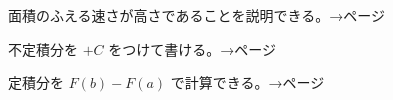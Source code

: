 \begin{furikaeri}
\begin{checklist}
\item 面積のふえる速さが高さであることを説明できる。\hfill{\footnotesize\sffamily\color{bkTheme}→\pageref{bk:5-11:kihon}ページ}
\item 不定積分を $+C$ をつけて書ける。\hfill{\footnotesize\sffamily\color{bkTheme}→\pageref{bk:5-11:genshi}ページ}
\item 定積分を $F(b)-F(a)$ で計算できる。\hfill{\footnotesize\sffamily\color{bkTheme}→\pageref{bk:5-11:teisekibun}ページ}
\end{checklist}
\end{furikaeri}

